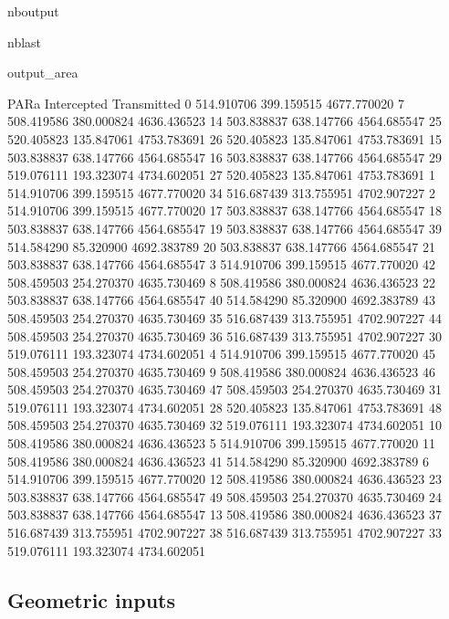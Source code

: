 \documentclass[letterpaper,10pt,english]{sphinxmanual}
\begin{document}
\begin{sphinxuseclass}{nboutput}
\begin{sphinxuseclass}{nblast}
{\begin{sphinxuseclass}{output_area}
\begin{sphinxuseclass}{}
\begin{sphinxVerbatim}[commandchars=\\\{\}]
          PARa  Intercepted  Transmitted
0   514.910706   399.159515  4677.770020
7   508.419586   380.000824  4636.436523
14  503.838837   638.147766  4564.685547
25  520.405823   135.847061  4753.783691
26  520.405823   135.847061  4753.783691
15  503.838837   638.147766  4564.685547
16  503.838837   638.147766  4564.685547
29  519.076111   193.323074  4734.602051
27  520.405823   135.847061  4753.783691
1   514.910706   399.159515  4677.770020
34  516.687439   313.755951  4702.907227
2   514.910706   399.159515  4677.770020
17  503.838837   638.147766  4564.685547
18  503.838837   638.147766  4564.685547
19  503.838837   638.147766  4564.685547
39  514.584290    85.320900  4692.383789
20  503.838837   638.147766  4564.685547
21  503.838837   638.147766  4564.685547
3   514.910706   399.159515  4677.770020
42  508.459503   254.270370  4635.730469
8   508.419586   380.000824  4636.436523
22  503.838837   638.147766  4564.685547
40  514.584290    85.320900  4692.383789
43  508.459503   254.270370  4635.730469
35  516.687439   313.755951  4702.907227
44  508.459503   254.270370  4635.730469
36  516.687439   313.755951  4702.907227
30  519.076111   193.323074  4734.602051
4   514.910706   399.159515  4677.770020
45  508.459503   254.270370  4635.730469
9   508.419586   380.000824  4636.436523
46  508.459503   254.270370  4635.730469
47  508.459503   254.270370  4635.730469
31  519.076111   193.323074  4734.602051
28  520.405823   135.847061  4753.783691
48  508.459503   254.270370  4635.730469
32  519.076111   193.323074  4734.602051
10  508.419586   380.000824  4636.436523
5   514.910706   399.159515  4677.770020
11  508.419586   380.000824  4636.436523
41  514.584290    85.320900  4692.383789
6   514.910706   399.159515  4677.770020
12  508.419586   380.000824  4636.436523
23  503.838837   638.147766  4564.685547
49  508.459503   254.270370  4635.730469
24  503.838837   638.147766  4564.685547
13  508.419586   380.000824  4636.436523
37  516.687439   313.755951  4702.907227
38  516.687439   313.755951  4702.907227
33  519.076111   193.323074  4734.602051
\end{sphinxVerbatim}



\end{sphinxuseclass}
\end{sphinxuseclass}
}

\end{sphinxuseclass}
\end{sphinxuseclass}
\sphinxstepscope


\subsection{Geometric inputs}
\label{\detokenize{input_scenes:Geometric-inputs}}\label{\detokenize{input_scenes::doc}}
\end{document}
